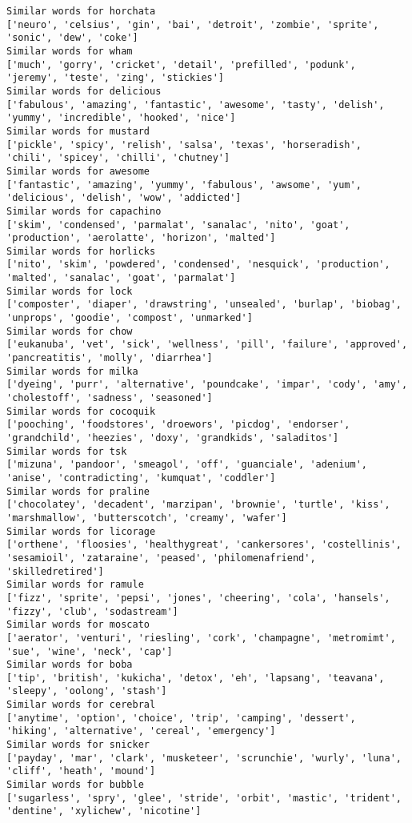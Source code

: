 \documentclass[11pt]{article}
\begin{document}
\begin{Verbatim}[commandchars=\\\{\}]
Similar words for horchata
['neuro', 'celsius', 'gin', 'bai', 'detroit', 'zombie', 'sprite', 'sonic', 'dew', 'coke']
Similar words for wham
['much', 'gorry', 'cricket', 'detail', 'prefilled', 'podunk', 'jeremy', 'teste', 'zing', 'stickies']
Similar words for delicious
['fabulous', 'amazing', 'fantastic', 'awesome', 'tasty', 'delish', 'yummy', 'incredible', 'hooked', 'nice']
Similar words for mustard
['pickle', 'spicy', 'relish', 'salsa', 'texas', 'horseradish', 'chili', 'spicey', 'chilli', 'chutney']
Similar words for awesome
['fantastic', 'amazing', 'yummy', 'fabulous', 'awsome', 'yum', 'delicious', 'delish', 'wow', 'addicted']
Similar words for capachino
['skim', 'condensed', 'parmalat', 'sanalac', 'nito', 'goat', 'production', 'aerolatte', 'horizon', 'malted']
Similar words for horlicks
['nito', 'skim', 'powdered', 'condensed', 'nesquick', 'production', 'malted', 'sanalac', 'goat', 'parmalat']
Similar words for lock
['composter', 'diaper', 'drawstring', 'unsealed', 'burlap', 'biobag', 'unprops', 'goodie', 'compost', 'unmarked']
Similar words for chow
['eukanuba', 'vet', 'sick', 'wellness', 'pill', 'failure', 'approved', 'pancreatitis', 'molly', 'diarrhea']
Similar words for milka
['dyeing', 'purr', 'alternative', 'poundcake', 'impar', 'cody', 'amy', 'cholestoff', 'sadness', 'seasoned']
Similar words for cocoquik
['pooching', 'foodstores', 'droewors', 'picdog', 'endorser', 'grandchild', 'heezies', 'doxy', 'grandkids', 'saladitos']
Similar words for tsk
['mizuna', 'pandoor', 'smeagol', 'off', 'guanciale', 'adenium', 'anise', 'contradicting', 'kumquat', 'coddler']
Similar words for praline
['chocolatey', 'decadent', 'marzipan', 'brownie', 'turtle', 'kiss', 'marshmallow', 'butterscotch', 'creamy', 'wafer']
Similar words for licorage
['orthene', 'floosies', 'healthygreat', 'cankersores', 'costellinis', 'sesamioil', 'zataraine', 'peased', 'philomenafriend', 'skilledretired']
Similar words for ramule
['fizz', 'sprite', 'pepsi', 'jones', 'cheering', 'cola', 'hansels', 'fizzy', 'club', 'sodastream']
Similar words for moscato
['aerator', 'venturi', 'riesling', 'cork', 'champagne', 'metromimt', 'sue', 'wine', 'neck', 'cap']
Similar words for boba
['tip', 'british', 'kukicha', 'detox', 'eh', 'lapsang', 'teavana', 'sleepy', 'oolong', 'stash']
Similar words for cerebral
['anytime', 'option', 'choice', 'trip', 'camping', 'dessert', 'hiking', 'alternative', 'cereal', 'emergency']
Similar words for snicker
['payday', 'mar', 'clark', 'musketeer', 'scrunchie', 'wurly', 'luna', 'cliff', 'heath', 'mound']
Similar words for bubble
['sugarless', 'spry', 'glee', 'stride', 'orbit', 'mastic', 'trident', 'dentine', 'xylichew', 'nicotine']

\end{Verbatim}
\end{document}
